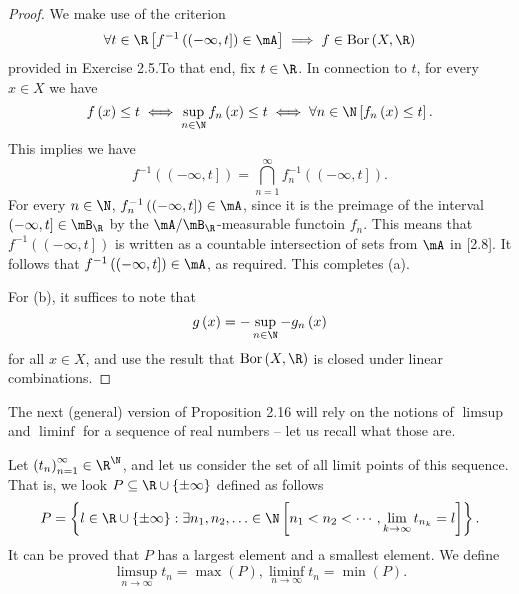 \documentclass[pmath450]{subfiles}
\begin{document}
    \begin{proof}
        We make use of the criterion
        \begin{equation*}
            \forall t\in\R\left[ f^{-1}\left( \left( -\infty,t \right] \right)\in\mA \right]\implies f\in\bor\left( X,\R \right)
        \end{equation*}
        provided in Exercise 2.5.\footnotemark[1] To that end, fix $t\in\R$. In connection to $t$, for every $x\in X$ we have
        \begin{equation*}
            f\left( x \right)\leq t\iff\sup_{n\in\N}f_n\left( x \right)\leq t\iff\forall n\in\N\left[ f_n\left( x \right)\leq t \right].
        \end{equation*}
        This implies we have
        \begin{equation}
            f^{-1}\left( \left( -\infty,t \right] \right) = \bigcap^{\infty}_{n=1} f_n^{-1}\left( \left( -\infty,t \right] \right).
        \end{equation}
        For every $n\in\N$, $f_n^{-1}\left( \left( -\infty,t \right] \right)\in\mA$, since it is the preimage of the interval $\left( -\infty,t \right]\in\mB_{\R}$ by the $\mA /\mB_{\R}$-measurable functoin $f_n$. This means that $f^{-1}\left( \left( -\infty,t \right] \right)$ is written as a countable intersection of sets from $\mA$ in [2.8]. It follows that $f^{-1}\left( \left( -\infty,t \right] \right)\in\mA$, as required. This completes (a).

        For (b), it suffices to note that 
        \begin{equation*}
            g\left( x \right) = -\sup_{n\in\N}-g_n\left( x \right)
        \end{equation*}
        for all $x\in X$, and use the result that $\bor\left( X,\R \right)$ is closed under linear combinations.
        
        \noindent
        \begin{minipage}{\textwidth}
            \footnotetext[1]{In fact, it suffices to check $f^{-1}\left( \left( -\infty,t \right] \right)\in\mA$ for all $t\in\Q$ only.}
        \end{minipage}
    \end{proof}

    \np The next (general) version of Proposition 2.16 will rely on the notions of $\limsup$ and $\liminf$ for a sequence of real numbers -- let us recall what those are.

    Let $\left( t_{n} \right)^{\infty}_{n=1}\in\R^{\N}$, and let us consider the set of all limit points of this sequence. That is, we look $P\subseteq\R\cup\left\lbrace \pm\infty \right\rbrace$ defined as follows
    \begin{equation*}
        P = \left\lbrace l\in\R\cup\left\lbrace \pm\infty \right\rbrace: \exists n_1,n_2,\ldots\in\N\left[ n_1<n_2<\cdots, \lim_{k\to\infty}t_{n_k} = l \right] \right\rbrace.
    \end{equation*}
    It can be proved that $P$ has a largest element and a smallest element. We define
    \begin{equation*}
        \limsup_{n\to\infty}t_n = \max\left( P \right), \liminf_{n\to\infty}t_n = \min\left( P \right).
    \end{equation*}
\end{document}
